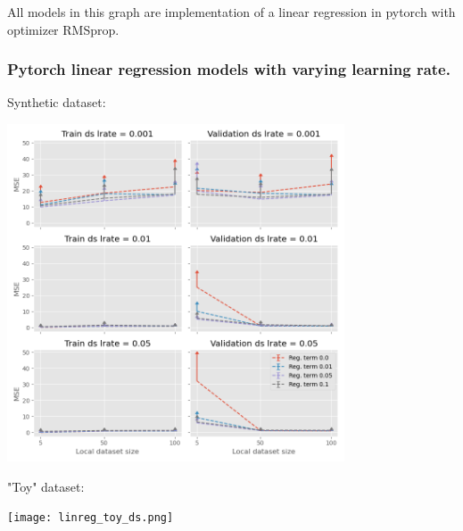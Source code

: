 \documentclass{article}
\begin{document}
All models in this graph are implementation of a linear regression in pytorch with optimizer RMSprop.

\subsubsection{Pytorch linear regression models with varying learning rate.}

Synthetic dataset:

\includegraphics[width=10cm]{linreg_syn_ds_lrate.png}

"Toy" dataset:

\texttt{[image: linreg\_toy\_ds.png]}
\end{document}
